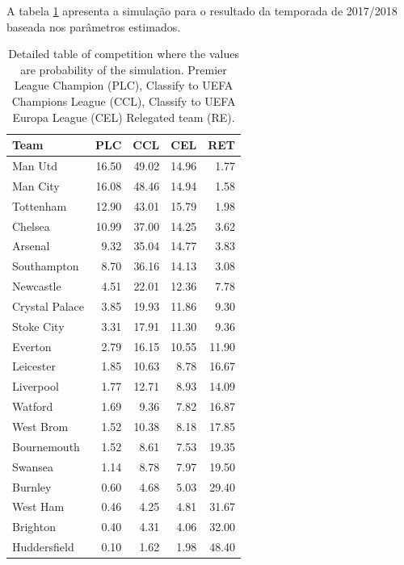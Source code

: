 \documentclass[review]{elsarticle}
\begin{document}
A tabela \ref{tab:forecastdissi} apresenta a simulação para o resultado da temporada de 2017/2018 baseada nos parâmetros estimados.


\begin{table}[ht]
\centering
\begin{tabular}{lrrrr}
  \hline
Team & PLC & CCL& CEL & RET \\ 
  \hline
Man Utd & 16.50 & 49.02 & 14.96 & 1.77 \\ 
  Man City & 16.08 & 48.46 & 14.94 & 1.58 \\ 
  Tottenham & 12.90 & 43.01 & 15.79 & 1.98 \\ 
  Chelsea & 10.99 & 37.00 & 14.25 & 3.62 \\ 
  Arsenal & 9.32 & 35.04 & 14.77 & 3.83 \\ 
  Southampton & 8.70 & 36.16 & 14.13 & 3.08 \\ 
  Newcastle & 4.51 & 22.01 & 12.36 & 7.78 \\ 
  Crystal Palace & 3.85 & 19.93 & 11.86 & 9.30 \\ 
  Stoke City & 3.31 & 17.91 & 11.30 & 9.36 \\ 
  Everton & 2.79 & 16.15 & 10.55 & 11.90 \\ 
  Leicester & 1.85 & 10.63 & 8.78 & 16.67 \\ 
  Liverpool & 1.77 & 12.71 & 8.93 & 14.09 \\ 
  Watford & 1.69 & 9.36 & 7.82 & 16.87 \\ 
  West Brom & 1.52 & 10.38 & 8.18 & 17.85 \\ 
  Bournemouth & 1.52 & 8.61 & 7.53 & 19.35 \\ 
  Swansea & 1.14 & 8.78 & 7.97 & 19.50 \\ 
  Burnley & 0.60 & 4.68 & 5.03 & 29.40 \\ 
  West Ham & 0.46 & 4.25 & 4.81 & 31.67 \\ 
  Brighton & 0.40 & 4.31 & 4.06 & 32.00 \\ 
  Huddersfield & 0.10 & 1.62 & 1.98 & 48.40 \\ 
   \hline
\end{tabular}
    \caption[\scriptsize{TAVB}]{\scriptsize{Detailed table of competition where the values are probability of the simulation. Premier League Champion (PLC), Classify to UEFA Champions League (CCL), Classify to UEFA Europa League (CEL) Relegated team (RE).}}
    \label{tab:forecastdissi}
\end{table}
\end{document}
